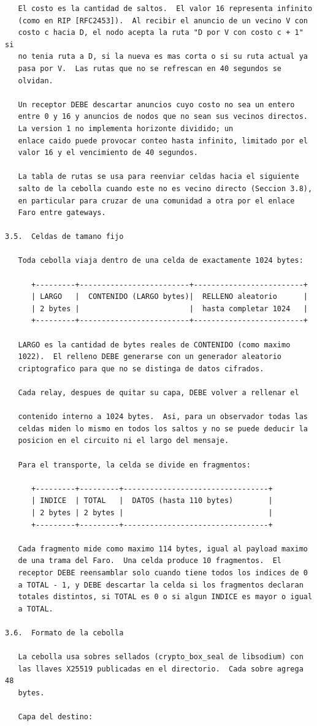 \newpage
\begin{Verbatim}
   El costo es la cantidad de saltos.  El valor 16 representa infinito
   (como en RIP [RFC2453]).  Al recibir el anuncio de un vecino V con
   costo c hacia D, el nodo acepta la ruta "D por V con costo c + 1" si
   no tenia ruta a D, si la nueva es mas corta o si su ruta actual ya
   pasa por V.  Las rutas que no se refrescan en 40 segundos se
   olvidan.

   Un receptor DEBE descartar anuncios cuyo costo no sea un entero
   entre 0 y 16 y anuncios de nodos que no sean sus vecinos directos.
   La version 1 no implementa horizonte dividido; un
   enlace caido puede provocar conteo hasta infinito, limitado por el
   valor 16 y el vencimiento de 40 segundos.

   La tabla de rutas se usa para reenviar celdas hacia el siguiente
   salto de la cebolla cuando este no es vecino directo (Seccion 3.8),
   en particular para cruzar de una comunidad a otra por el enlace
   Faro entre gateways.

3.5.  Celdas de tamano fijo

   Toda cebolla viaja dentro de una celda de exactamente 1024 bytes:

      +---------+-------------------------+-------------------------+
      | LARGO   |  CONTENIDO (LARGO bytes)|  RELLENO aleatorio      |
      | 2 bytes |                         |  hasta completar 1024   |
      +---------+-------------------------+-------------------------+

   LARGO es la cantidad de bytes reales de CONTENIDO (como maximo
   1022).  El relleno DEBE generarse con un generador aleatorio
   criptografico para que no se distinga de datos cifrados.

   Cada relay, despues de quitar su capa, DEBE volver a rellenar el

   contenido interno a 1024 bytes.  Asi, para un observador todas las
   celdas miden lo mismo en todos los saltos y no se puede deducir la
   posicion en el circuito ni el largo del mensaje.

   Para el transporte, la celda se divide en fragmentos:

      +---------+---------+---------------------------------+
      | INDICE  | TOTAL   |  DATOS (hasta 110 bytes)        |
      | 2 bytes | 2 bytes |                                 |
      +---------+---------+---------------------------------+

   Cada fragmento mide como maximo 114 bytes, igual al payload maximo
   de una trama del Faro.  Una celda produce 10 fragmentos.  El
   receptor DEBE reensamblar solo cuando tiene todos los indices de 0
   a TOTAL - 1, y DEBE descartar la celda si los fragmentos declaran
   totales distintos, si TOTAL es 0 o si algun INDICE es mayor o igual
   a TOTAL.

3.6.  Formato de la cebolla

   La cebolla usa sobres sellados (crypto_box_seal de libsodium) con
   las llaves X25519 publicadas en el directorio.  Cada sobre agrega 48
   bytes.

   Capa del destino:
\end{Verbatim}
